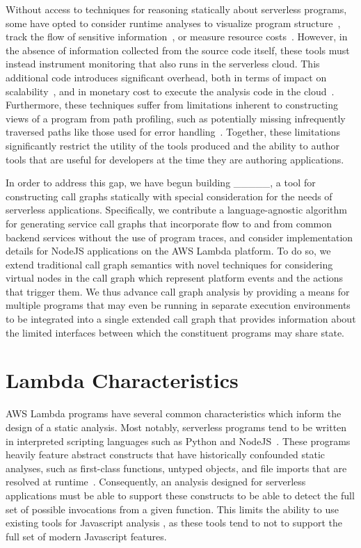 Without access to techniques for reasoning statically about serverless programs, some have opted to consider runtime analyses to visualize program structure~\cite{lowgo,causalorder}, track the flow of sensitive information~\cite{ifc}, or measure resource costs~\cite{curtain}. However, in the absence of information collected from the source code itself, these tools must instead instrument monitoring that also runs in the serverless cloud. This additional code introduces significant overhead, both in terms of impact on scalability~\cite{SOMETHING}, and in monetary cost to execute the analysis code in the cloud~\cite{serverlesscost}. Furthermore, these techniques suffer from limitations inherent to constructing views of a program from path profiling, such as potentially missing infrequently traversed paths like those used for error handling~\cite{SOMETHING}. Together, these limitations significantly restrict the utility of the tools produced and the ability to author tools that are useful for developers at the time they are authoring applications. \par
In order to address this gap, we have begun building \_\_\_\_\_, a tool for constructing call graphs statically with special consideration for the needs of serverless applications. Specifically, we contribute a language-agnostic algorithm for generating service call graphs that incorporate flow to and from common backend services without the use of program traces, and consider implementation details for NodeJS applications on the AWS Lambda platform. To do so, we extend traditional call graph semantics with novel techniques for considering virtual nodes in the call graph which represent platform events and the actions that trigger them. We thus advance call graph analysis by providing a means for multiple programs that may even be running in separate execution environments to be integrated into a single extended call graph that provides information about the limited interfaces between which the constituent programs may share state. \par

\section{Lambda Characteristics}
AWS Lambda programs have several common characteristics which inform the design of a static analysis. Most notably, serverless programs tend to be written in interpreted scripting languages such as Python and NodeJS~\cite{trends}. These programs heavily feature abstract constructs that have historically confounded static analyses, such as first-class functions, untyped objects, and file imports that are resolved at runtime~\cite{scriptingchallenges}. Consequently, an analysis designed for serverless applications must be able to support these constructs to be able to detect the full set of possible invocations from a given function. This limits the ability to use existing tools for Javascript analysis \cite{WALA,JSSAFE}, as these tools tend to not to support the full set of modern Javascript features.\par

